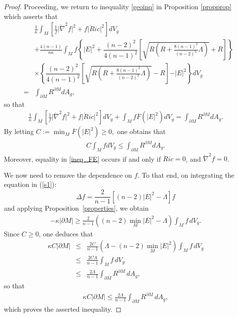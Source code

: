 \documentclass{amsart}
\numberwithin{equation}{section}
\begin{document}
\begin{proof}
Proceeding, we return to inequality \eqref{geoinq} in Proposition \ref{propprop} which asserts that 
\begin{eqnarray*}
&&	\frac{1}{\kappa}\int_{M}\left[\frac{1}{f}\vert\mathring{\nabla}^2f\vert^{2} + f\vert\mathring{R}ic\vert^{2}\right]dV_{g}\nonumber\\
&& + \frac{4(n-1)}{n\kappa}\int_{M}f\left\{\vert E\vert^{2} +  \dfrac{(n-2)^2}{4(n - 1)^2}\left[\sqrt{R\left(R + \frac{8(n-1)^2}{(n-2)^3}\Lambda\right)} +R\right]\right\}\nonumber\\
&&\times\left\{\dfrac{(n-2)^2}{4(n - 1)^2}\left[\sqrt{R\left(R + \frac{8(n-1)^2}{(n-2)^3}\Lambda\right)} - R\right] - \vert E\vert^{2}\right\}dV_{g}\nonumber\\
&=& \int_{\partial M} R^{\partial M} dA_{g},
\end{eqnarray*}
so that
	\begin{eqnarray*}
		\frac{1}{\kappa}\int_{M}\left[\frac{1}{f}\vert\mathring{\nabla}^2f\vert^{2} + f\vert\mathring{R}ic\vert^{2}\right]dV_{g} + \int_{M}f\overline{F}(\vert E\vert^{2})dV_{g}=
		\int_{\partial M} R^{\partial M} dA_{g}.
	\end{eqnarray*}
By letting \(C := \min_M \overline{F}(\vert E\vert^{2}) \geq 0,\) one obtains that
\begin{eqnarray}\label{ineq_FE}
C\int_{M}fdV_{g}\leq
\int_{\partial M} R^{\partial M} dA_{g}.
\end{eqnarray} Moreover, equality in \eqref{ineq_FE} occurs if and only if $\mathring{R}ic=0$, and $\mathring{\nabla}^{2}f=0$. 





We now need to remove the dependence on $f.$ To that end, on integrating the equation in (\ref{s1}):
\[
\Delta f = \frac{2}{n-1} \left[(n-2)|E|^{2} - \Lambda\right] f
\]
and applying Proposition~\ref{properties}, we obtain
\begin{eqnarray*}
	- \kappa \vert \partial M \vert \geq \frac{2}{n-1} \left((n-2) \min_M |E|^{2} - \Lambda\right) \int_M f \, dV_g.
\end{eqnarray*}
Since $C \geq 0$, one deduces that
\begin{eqnarray*}
	\kappa C \vert \partial M \vert &\leq& \frac{2C}{n-1} \left( \Lambda - (n-2) \min_M |E|^{2} \right) \int_M f \, dV_g \\
	&\leq& \frac{2C\Lambda}{n-1} \int_M f \, dV_g \\
	&\leq& \frac{2\Lambda}{n-1} \int_{\partial M} R^{\partial M} \, dA_g,
\end{eqnarray*}
so that
\begin{eqnarray} \label{mainteo4}
	\kappa C \vert \partial M \vert \leq \frac{2\Lambda}{n-1} \int_{\partial M} R^{\partial M} \, dA_g,
\end{eqnarray} which proves the asserted inequality. 




\end{proof}
\end{document}

